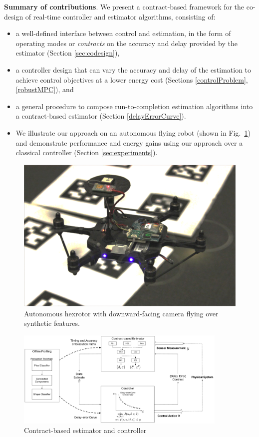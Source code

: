 \textbf{Summary of contributions}.
We present a contract-based framework for the co-design of real-time controller and estimator algorithms, consisting of:
\begin{itemize}
	\item a well-defined interface between control and estimation, in the form of operating modes or \emph{contracts} on the accuracy and delay provided by the estimator (Section \ref{sec:codesign}),
	\item a controller design that can vary the accuracy and delay of the estimation to achieve control objectives at a lower energy cost (Sections \ref{controlProblem}, \ref{robustMPC}), and
	\item a general procedure to compose run-to-completion estimation algorithms into a contract-based estimator (Section \ref{delayErrorCurve}).
	\item We illustrate our approach on an autonomous flying robot (shown in Fig.~\ref{fig:nanohex}) and demonstrate performance and energy gains using our approach over a classical controller (Section \ref{sec:experiments}).
\end{itemize}
\begin{figure}[t]
	\centering
	\includegraphics[width=0.7\linewidth]{figures/nanohex2}
	\caption{Autonomous hexrotor with downward-facing camera flying over synthetic features.}
	\label{fig:nanohex}
\end{figure}
\begin{figure}[t]
	\centering
	\includegraphics[width=0.9\textwidth]{figures/omnigraffle_figures/process_figure2}
	\caption{Contract-based estimator and controller}
	\label{fig:fullcodesignedCE}
\end{figure}